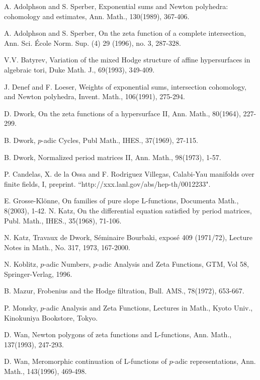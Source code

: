 \documentclass[10XSpt]{article}
\begin{document}
\begin{thebibliography}{[MT1]}

%
 A. Adolphson and S. Sperber, Exponential sums and Newton polyhedra: 
cohomology and estimates, Ann. Math., 130(1989), 367-406. 

%
A. Adolphson and S. Sperber, 
On the zeta function of a complete intersection,  Ann. Sci. \'Ecole Norm. Sup. 
(4) 29 (1996), no. 3, 287-328.

%
 V.V. Batyrev, Variation of the mixed Hodge structure of affine hypersurfaces 
in algebraic tori, Duke Math. J., 69(1993), 349-409.  

%
J. Denef and F. Loeser, Weights of exponential sums, intersection cohomology, 
and Newton polyhedra, Invent. Math., 106(1991), 275-294. 


%
D. Dwork, On the zeta functions of a hypersurface II, 
Ann. Math., 80(1964), 227-299. 

%
B. Dwork, $p$-adic Cycles, Publ Math., IHES., 37(1969), 27-115. 

%
 B. Dwork,
Normalized period matrices II, Ann. Math., 98(1973), 1-57.


%
 P. Candelas, X. de la Ossa and F. Rodriguez Villegas, 
Calabi-Yau manifolds over finite fields, I, preprint. 
``http://xxx.lanl.gov/abs/hep-th/0012233".  


%
 E. Grosse-Kl\"onne, On families of pure slope L-functions, Documenta Math., 
8(2003), 1-42. 
%
N. Katz, On the differential equation satisfied by period matrices, 
Publ. Math., IHES., 35(1968), 71-106. 

%
N. Katz, Travaux de Dwork,
S\'eminaire Bourbaki, expos\'e 409 (1971/72),
Lecture Notes in Math., No. 317, 1973, 167-2000.

%
N. Koblitz, $p$-adic Numbers, $p$-adic Analysis and Zeta Functions, 
GTM, Vol 58, Springer-Verlag, 1996. 

%
B. Mazur, Frobenius and the Hodge filtration, Bull. AMS., 78(1972), 
653-667. 

%
P. Monsky, $p$-adic Analysis and Zeta Functions, Lectures in Math., 
Kyoto Univ., Kinokuniya Bookstore, Tokyo. 

%
 D. Wan, Newton polygons of zeta functions and L-functions, 
Ann. Math., 137(1993), 247-293.


%
 D. Wan, Meromorphic continuation of L-functions of $p$-adic
representations, Ann. Math., 143(1996), 469-498.



\end{thebibliography}
\end{document}
